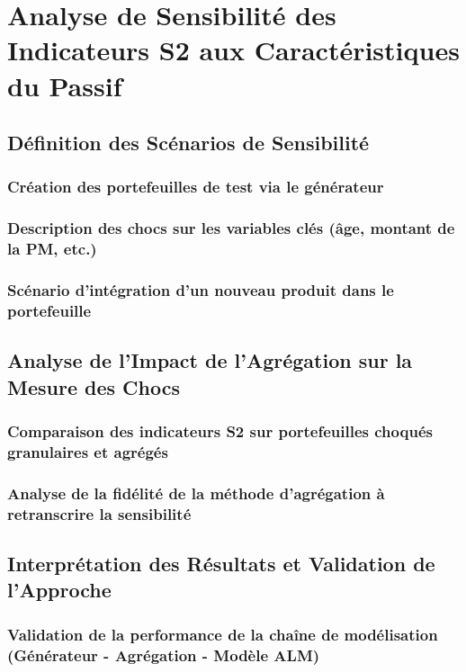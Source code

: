 \chapter{Analyse de Sensibilité des Indicateurs S2 aux Caractéristiques du Passif}

\section{Définition des Scénarios de Sensibilité}
    \subsection{Création des portefeuilles de test via le générateur}
    \subsection{Description des chocs sur les variables clés (âge, montant de la PM, etc.)}
    \subsection{Scénario d'intégration d'un nouveau produit dans le portefeuille}

\section{Analyse de l'Impact de l'Agrégation sur la Mesure des Chocs}
    \subsection{Comparaison des indicateurs S2 sur portefeuilles choqués granulaires et agrégés}
    \subsection{Analyse de la fidélité de la méthode d'agrégation à retranscrire la sensibilité}

\section{Interprétation des Résultats et Validation de l'Approche}
    \subsection{Validation de la performance de la chaîne de modélisation (Générateur - Agrégation - Modèle ALM)}
